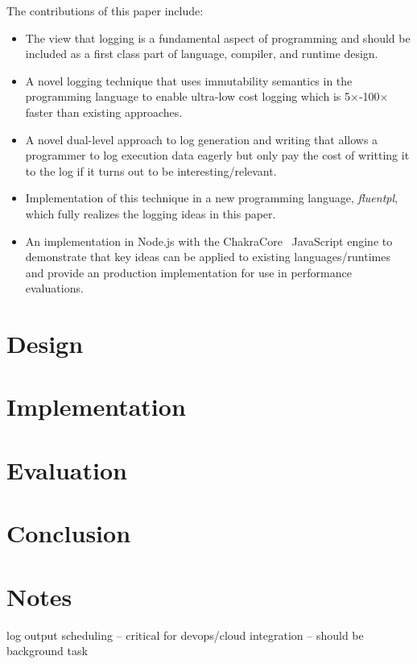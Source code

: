 \documentclass[preprint]{sig-alternate-05-2015}
\begin{document}
\noindent
The contributions of this paper include:
\begin{itemize}
\item The view that logging is a fundamental aspect of programming and should be
included as a first class part of language, compiler, and runtime design.

\item A novel logging technique that uses immutability semantics in the
programming language to enable ultra-low cost logging which is
5$\times$-100$\times$ faster than existing approaches.

\item A novel dual-level approach to log generation and writing that allows a
programmer to log execution data eagerly but only pay the cost of writting it to
the log if it turns out to be interesting/relevant.

\item Implementation of this technique in a new programming language,
\emph{fluentpl}, which fully realizes the logging ideas in this paper. 

\item An implementation in Node.js with the ChakraCore~\cite{NodeChakraCore} 
JavaScript engine to demonstrate that key ideas can be applied to existing
languages/runtimes and provide an production implementation for use in
performance evaluations.
\end{itemize}

\section{Design}
\label{sec:design}


\section{Implementation}

\section{Evaluation}

\section{Conclusion}

\section{Notes} log output scheduling -- critical for devops/cloud integration
-- should be background task


\balance

{
\raggedright 


 
}
\end{document}
